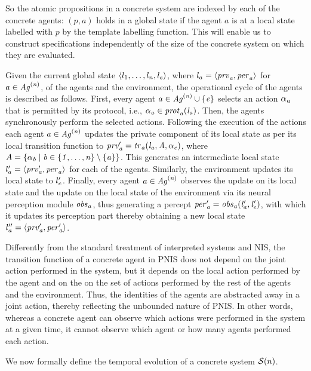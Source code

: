 So the atomic propositions in a concrete system are indexed by each of the
concrete agents: $(p, a)$ holds in a global state if the agent $a$ is at a local
state labelled with $p$ by the template labelling function. This will enable us
to construct specifications independently of the size of the concrete system on
which they are evaluated.

Given the current global state $\left \langle l_{1}, \ldots, l_{n}, l_{e} \right \rangle$, where $l_{a} = \left \langle \it{prv}_{a}, \it{per}_{a} \right \rangle$ for $a \in \it{Ag}^{(n)}$, of the
agents and the environment, the operational cycle of the agents is described as
follows. First, every agent ${a} \in \it{Ag}^{(n)} \cup \left \{ {e} \right \}$ selects an
action $\it{\alpha}_{a}$ that is permitted by its protocol, i.e., $\it{\alpha}_{a} \in \it{prot}_{a}(l_{a})$. Then, the agents synchronously perform the selected actions.
Following  the execution of the actions each agent ${a} \in \it{Ag}^{(n)}$ updates
the private component of its local state as per its local transition function to
$\it{prv}'_{a} = \it{tr}_{a} ( l_{a}, A, \it{\alpha}_{e})$, where $A = \left \{  \it{\alpha}_{b} \mid b \in
\left \{ 1, \ldots, n \right \} \setminus \left \{ a \right \} \right \}$.  This generates an intermediate local
state $l'_{a} = \left \langle \it{prv}'_{a}, \it{per}_{a} \right \rangle$ for each of the agents. Similarly,
the  environment updates its local state to $l'_{e}$. Finally, every agent
${a} \in \it{Ag}^{(n)}$ observes the update on its local state and the update on the
local state of the environment via its neural perception module $\it{obs}_{a}$, thus
generating a percept $\it{per}'_{a} = \it{obs}_{a}(l'_{a}, l'_{e})$, with which it
updates its perception part thereby obtaining a new local state $l''_{a} =
\left \langle  \it{prv}'_{a}, \it{per}'_{a} \right \rangle$.


Differently from the standard treatment of interpreted systems and NIS, the
transition function of a concrete agent in PNIS  does not depend on the joint
action performed in the system, but it depends on the local action performed by
the  agent and on the on the set of actions performed by the rest of the agents
and the environment.  Thus, the identities of the agents are abstracted away in
a joint action, thereby reflecting the unbounded nature of PNIS. In other words,
whereas  a concrete agent can observe which actions were performed in the system
at a given time,  it cannot observe which agent or how many agents performed
each action.

We now formally define the temporal evolution of a concrete system
$\mathcal{S}(n)$.



